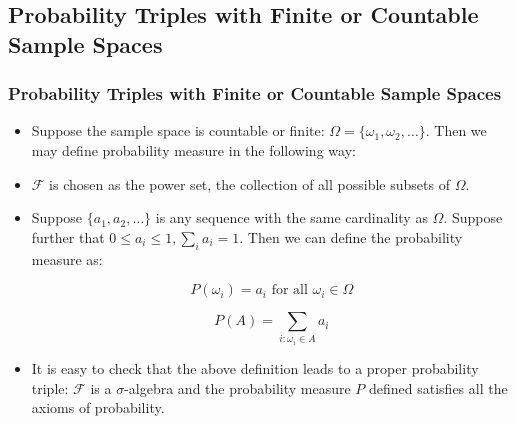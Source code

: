 \documentclass[handout]{beamer}
\begin{document}
\subsection{Probability Triples with Finite or Countable Sample Spaces}
\frame
{
  \frametitle{Probability Triples with Finite or Countable Sample Spaces}

   \begin{itemize}

      
       \item<1-> Suppose the sample space is countable or finite: $\Omega=\{\omega_1, \omega_2,\ldots\}$. Then we may define probability measure in the following way:  
       

             \item<2-> $\mathcal{F}$ is chosen  as the power set, the collection of all possible subsets of $\Omega$. 
             
                     \item<3-> Suppose $\{a_1, a_2, \ldots\}$ is any sequence with the same cardinality as $\Omega$. Suppose further that $0\leq a_i \leq 1, \sum_i a_i=1$. Then we can define the probability measure as:
                     
                    $$P(\omega_i)=a_i \text{ for all } \omega_i \in \Omega$$
                     
                     $$P(A)=\sum_{i: \omega_i \in A} a_i$$
                                          
            
             
              \item<4-> It is easy to check that the above definition leads to a proper probability triple: $\mathcal{F}$ is a $\sigma$-algebra and the probability measure $P$ defined  satisfies all the axioms of probability. 
                              \end{itemize}
}
\end{document}
